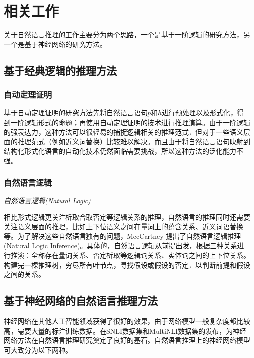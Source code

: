 \documentclass[UTF8,11pt,a4paper,nofonts]{ctexart}
\begin{document}
\section{相关工作}

关于自然语言推理的工作主要分为两个思路，一个是基于一阶逻辑的研究方法，另一个是基于神经网络的研究方法。

\subsection{基于经典逻辑的推理方法}

\subsubsection{自动定理证明}

基于自动定理证明的研究方法\cite{}先将自然语言语句$p$和$h$进行预处理以及形式化，得到一阶逻辑形式的命题；再使用自动定理证明\cite{}的技术进行推理演算。由于一阶逻辑的强表达力，这种方法可以很轻易的捕捉逻辑相关的推理范式，但对于一些语义层面的推理范式（例如近义词替换）比较难以解决。而且由于将自然语言语句映射到结构化形式化语言的自动化技术仍然面临需要挑战，所以这种方法的泛化能力不强。

\subsubsection{自然语言逻辑}

\textit{自然语言逻辑(Natural Logic)}

相比形式逻辑更关注析取合取否定等逻辑关系的推理，自然语言的推理同时还需要关注语义层面的推理，比如上下位语义之间在量词上的蕴含关系、近义词语替换等。为了解决这些自然语言独有的问题，MccCartney 提出了自然语言逻辑推理(Natural Logic Inference)\cite{}。具体的，自然语言逻辑从前提出发，根据三种关系进行推演：全称存在量词关系、否定析取等逻辑词关系、实体词之间的上下位关系。构建完一棵推理树，穷尽所有叶节点，寻找假设或假设的否定，以判断前提和假设之间的关系。



\subsection{基于神经网络的自然语言推理方法}

神经网络在其他人工智能领域获得了很好的效果，由于网络模型一般复杂度都比较高，需要大量的标注训练数据。在SNLI数据集\cite{}和MultiNLI数据集的发布，为神经网络方法在自然语言推理研究奠定了良好的基石。自然语言推理上的神经网络模型可大致分为以下两种。
\end{document}
